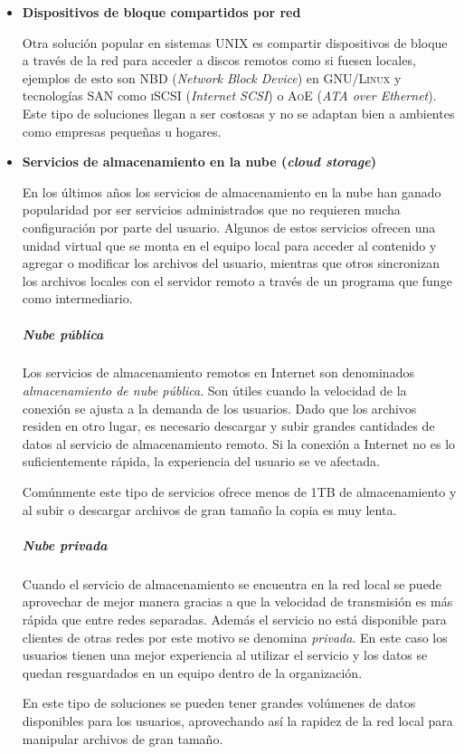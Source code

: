 \begin{itemize}
\newpage
      \item \textbf{Dispositivos de bloque compartidos por red}

Otra soluci\'{o}n popular en sistemas \textsc{UNIX} es compartir dispositivos de bloque a trav\'{e}s de la red para acceder a discos remotos como si fuesen locales, ejemplos de esto son \textsc{NBD} (\textit{Network Block Device}) en \textsc{GNU/Linux} y tecnolog\'{i}as \textsc{SAN} como \textsc{iSCSI} (\textit{Internet SCSI}) o \textsc{AoE} (\textit{ATA over Ethernet}). Este tipo de soluciones llegan a ser costosas y no se adaptan bien a ambientes como empresas peque\~{n}as u hogares.

      \item \textbf{Servicios de almacenamiento en la nube (\emph{cloud storage})}

En los \'{u}ltimos a\~{n}os los servicios de almacenamiento en la nube han ganado popularidad por ser servicios administrados que no requieren mucha configuraci\'{o}n por parte del usuario. Algunos de estos servicios ofrecen una unidad virtual que se monta en el equipo local para acceder al contenido y agregar o modificar los archivos del usuario, mientras que otros sincronizan los archivos locales con el servidor remoto a trav\'{e}s de un programa que funge como intermediario.

        \subparagraph*{Nube p\'{u}blica \\}

Los servicios de almacenamiento remotos en Internet son denominados \emph{almacenamiento de nube p\'{u}blica}. Son \'{u}tiles cuando la velocidad de la conexi\'{o}n se ajusta a la demanda de los usuarios. Dado que los archivos residen en otro lugar, es necesario descargar y subir grandes cantidades de datos al servicio de almacenamiento remoto. Si la conexi\'{o}n a Internet no es lo suficientemente r\'{a}pida, la experiencia del usuario se ve afectada.

Com\'{u}nmente este tipo de servicios ofrece menos de 1\textsc{\gls{TB}} de almacenamiento y al subir o descargar archivos de gran tama\~{n}o la copia es muy lenta.

        \subparagraph*{Nube privada \\}

Cuando el servicio de almacenamiento se encuentra en la red local se puede aprovechar de mejor manera gracias a que la velocidad de transmisi\'{o}n es m\'{a}s r\'{a}pida que entre redes separadas. Adem\'{a}s el servicio no est\'{a} disponible para clientes de otras redes por este motivo se denomina \emph{privada}. En este caso los usuarios tienen una mejor experiencia al utilizar el servicio y los datos se quedan resguardados en un equipo dentro de la organizaci\'{o}n.

En este tipo de soluciones se pueden tener grandes vol\'{u}menes de datos disponibles para los usuarios, aprovechando as\'{i} la rapidez de la red local para manipular archivos de gran tama\~{n}o. %

    \end{itemize}

